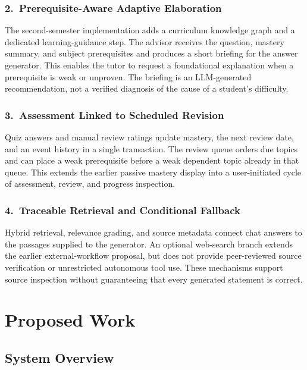 \documentclass[11pt, a4paper, oneside]{report}
\begin{document}
\subsection*{2.\ Prerequisite-Aware Adaptive Elaboration}
The second-semester implementation adds a curriculum knowledge graph and a dedicated learning-guidance step. The advisor receives the question, mastery summary, and subject prerequisites and produces a short briefing for the answer generator. This enables the tutor to request a foundational explanation when a prerequisite is weak or unproven. The briefing is an LLM-generated recommendation, not a verified diagnosis of the cause of a student's difficulty.

\subsection*{3.\ Assessment Linked to Scheduled Revision}
Quiz answers and manual review ratings update mastery, the next review date, and an event history in a single transaction. The review queue orders due topics and can place a weak prerequisite before a weak dependent topic already in that queue. This extends the earlier passive mastery display into a user-initiated cycle of assessment, review, and progress inspection.

\subsection*{4.\ Traceable Retrieval and Conditional Fallback}
Hybrid retrieval, relevance grading, and source metadata connect chat answers to the passages supplied to the generator. An optional web-search branch extends the earlier external-workflow proposal, but does not provide peer-reviewed source verification or unrestricted autonomous tool use. These mechanisms support source inspection without guaranteeing that every generated statement is correct.

\chapter{Proposed Work}

\section{System Overview}
\end{document}
